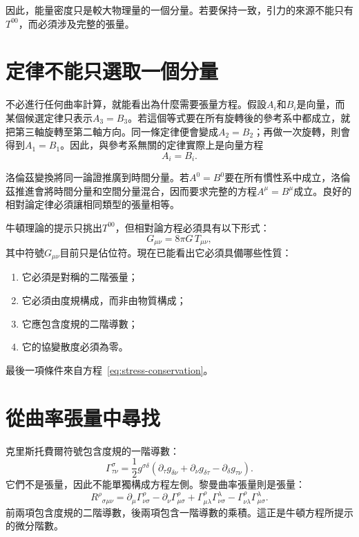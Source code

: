 \begin{classroomqa}
\end{classroomqa}

因此，能量密度只是較大物理量的一個分量。若要保持一致，引力的來源不能只有\(T^{00}\)，而必須涉及完整的張量。

\section{定律不能只選取一個分量}

不必進行任何曲率計算，就能看出為什麼需要張量方程。假設\(A_i\)和\(B_i\)是向量，而某個候選定律只表示\(A_3=B_3\)。若這個等式要在所有旋轉後的參考系中都成立，就把第三軸旋轉至第二軸方向。同一條定律便會變成\(A_2=B_2\)；再做一次旋轉，則會得到\(A_1=B_1\)。因此，與參考系無關的定律實際上是向量方程
\begin{equation}
 A_i=B_i.
\end{equation}

洛倫茲變換將同一論證推廣到時間分量。若\(A^0=B^0\)要在所有慣性系中成立，洛倫茲推進會將時間分量和空間分量混合，因而要求完整的方程\(A^\mu=B^\mu\)成立。良好的相對論定律必須讓相同類型的張量相等。

牛頓理論的提示只挑出\(T^{00}\)，但相對論方程必須具有以下形式：
\begin{equation}
 G_{\mu\nu}=8\pi G\,T_{\mu\nu},
 \label{eq:field-schematic}
\end{equation}
其中符號\(G_{\mu\nu}\)目前只是佔位符。現在已能看出它必須具備哪些性質：
\begin{enumerate}
 \item 它必須是對稱的二階張量；
 \item 它必須由度規構成，而非由物質構成；
 \item 它應包含度規的二階導數；
 \item 它的協變散度必須為零。
\end{enumerate}
最後一項條件來自方程~\eqref{eq:stress-conservation}。

\section{從曲率張量中尋找}

克里斯托費爾符號包含度規的一階導數：
\begin{equation}
 \Gamma^\sigma_{\tau\nu}
 =
 \frac12 g^{\sigma\delta}
 \left(
 \partial_\tau g_{\delta\nu}
 +\partial_\nu g_{\delta\tau}
 -\partial_\delta g_{\tau\nu}
 \right).
 \label{eq:christoffel}
\end{equation}
它們不是張量，因此不能單獨構成方程左側。黎曼曲率張量則是張量：
\begin{equation}
 R^\rho{}_{\sigma\mu\nu}
 =
 \partial_\mu\Gamma^\rho_{\nu\sigma}
 -\partial_\nu\Gamma^\rho_{\mu\sigma}
 +\Gamma^\rho_{\mu\lambda}\Gamma^\lambda_{\nu\sigma}
 -\Gamma^\rho_{\nu\lambda}\Gamma^\lambda_{\mu\sigma}.
 \label{eq:riemann}
\end{equation}
前兩項包含度規的二階導數，後兩項包含一階導數的乘積。這正是牛頓方程所提示的微分階數。

